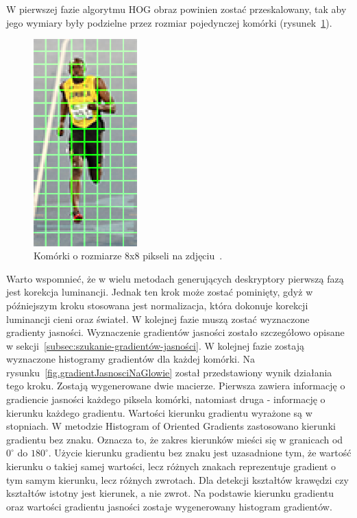 \documentclass[a4paper,twoside,12pt]{book}
\begin{document}
    W pierwszej fazie algorytmu HOG obraz powinien zostać przeskalowany, tak aby jego wymiary były podzielne przez
    rozmiar
    pojedynczej komórki
    (rysunek~\ref{fig.komorkiHoga}).
    \begin{figure}
        \centering
        \includegraphics[width=4cm]{Obrazy/komorkiHoga.jpg}
        \caption{Komórki o rozmiarze 8x8 pikseli na zdjęciu~\cite{hogOpenCv}.}
        \label{fig.komorkiHoga}
    \end{figure}
    Warto wspomnieć, że w wielu metodach generujących deskryptory pierwszą fazą jest korekcja luminancji.
    Jednak ten krok może zostać pominięty, gdyż w późniejszym kroku stosowana jest normalizacja,
    która dokonuje korekcji luminancji cieni oraz świateł.
    W kolejnej fazie muszą zostać wyznaczone gradienty jasności.
    Wyznaczenie gradientów jasności zostało szczegółowo opisane w sekcji~\ref{subsec:szukanie-gradientów-jasności}.
    W kolejnej fazie zostają wyznaczone histogramy gradientów dla każdej komórki.
    Na rysunku~\ref{fig.gradientJasnosciNaGlowie} został przedstawiony wynik działania tego kroku.
    Zostają wygenerowane dwie macierze. Pierwsza zawiera informację o gradiencie jasności każdego piksela komórki,
    natomiast druga - informację o kierunku każdego gradientu.
    Wartości kierunku gradientu wyrażone są w stopniach. W metodzie Histogram of Oriented Gradients
    zastosowano kierunki gradientu bez znaku. Oznacza to, że zakres kierunków mieści się w granicach
    od $0^{\circ}$ do $180^{\circ}$.
    Użycie kierunku gradientu bez znaku jest uzasadnione tym,
    że wartość kierunku o takiej samej wartości, lecz różnych znakach reprezentuje gradient o tym samym kierunku, lecz
    różnych zwrotach. Dla detekcji kształtów krawędzi czy kształtów istotny jest kierunek, a nie zwrot.
    Na podstawie kierunku gradientu oraz wartości gradientu jasności zostaje wygenerowany histogram gradientów.
\end{document}
